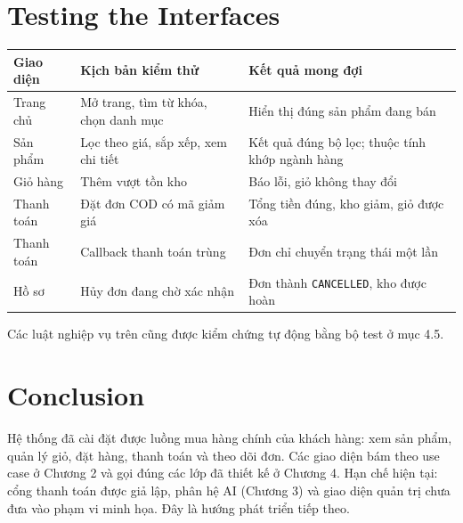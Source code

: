 \documentclass[12pt,a4paper,oneside]{report}
\begin{document}
\section{Testing the Interfaces}

\begin{longtable}{@{}p{2.2cm}p{6.4cm}p{6.8cm}@{}}
\toprule
\textbf{Giao diện} & \textbf{Kịch bản kiểm thử} & \textbf{Kết quả mong đợi} \\
\midrule
\endhead
Trang chủ & Mở trang, tìm từ khóa, chọn danh mục & Hiển thị đúng sản phẩm đang bán \\
Sản phẩm & Lọc theo giá, sắp xếp, xem chi tiết & Kết quả đúng bộ lọc; thuộc tính khớp ngành hàng \\
Giỏ hàng & Thêm vượt tồn kho & Báo lỗi, giỏ không thay đổi \\
Thanh toán & Đặt đơn COD có mã giảm giá & Tổng tiền đúng, kho giảm, giỏ được xóa \\
Thanh toán & Callback thanh toán trùng & Đơn chỉ chuyển trạng thái một lần \\
Hồ sơ & Hủy đơn đang chờ xác nhận & Đơn thành \texttt{CANCELLED}, kho được hoàn \\
\bottomrule
\end{longtable}
\noindent Các luật nghiệp vụ trên cũng được kiểm chứng tự động bằng bộ test ở mục 4.5.

\section{Conclusion}
Hệ thống đã cài đặt được luồng mua hàng chính của khách hàng: xem sản phẩm, quản lý giỏ, đặt hàng, thanh toán và theo dõi đơn. Các giao diện bám theo use case ở Chương 2 và gọi đúng các lớp đã thiết kế ở Chương 4. Hạn chế hiện tại: cổng thanh toán được giả lập, phân hệ AI (Chương 3) và giao diện quản trị chưa đưa vào phạm vi minh họa. Đây là hướng phát triển tiếp theo.
\end{document}
